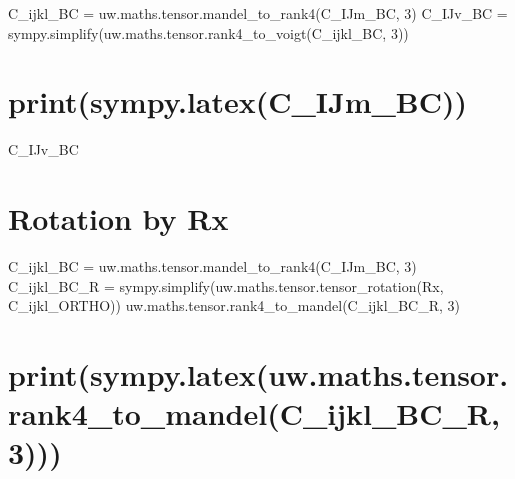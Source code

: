 \documentclass[
  letterpaper,
  DIV=11,
  numbers=noendperiod]{scrreprt}
\begin{document}
C\_ijkl\_BC = uw.maths.tensor.mandel\_to\_rank4(C\_IJm\_BC, 3)
C\_IJv\_BC =
sympy.simplify(uw.maths.tensor.rank4\_to\_voigt(C\_ijkl\_BC, 3))

\chapter{print(sympy.latex(C\_IJm\_BC))}\label{printsympy.latexc_ijm_bc}

C\_IJv\_BC

\chapter{Rotation by Rx}\label{rotation-by-rx}

C\_ijkl\_BC = uw.maths.tensor.mandel\_to\_rank4(C\_IJm\_BC, 3)
C\_ijkl\_BC\_R = sympy.simplify(uw.maths.tensor.tensor\_rotation(Rx,
C\_ijkl\_ORTHO)) uw.maths.tensor.rank4\_to\_mandel(C\_ijkl\_BC\_R, 3)

\chapter{print(sympy.latex(uw.maths.tensor.rank4\_to\_mandel(C\_ijkl\_BC\_R,
3)))}\label{printsympy.latexuw.maths.tensor.rank4_to_mandelc_ijkl_bc_r-3}

\begin{verbatim}
\end{verbatim}
\end{document}
